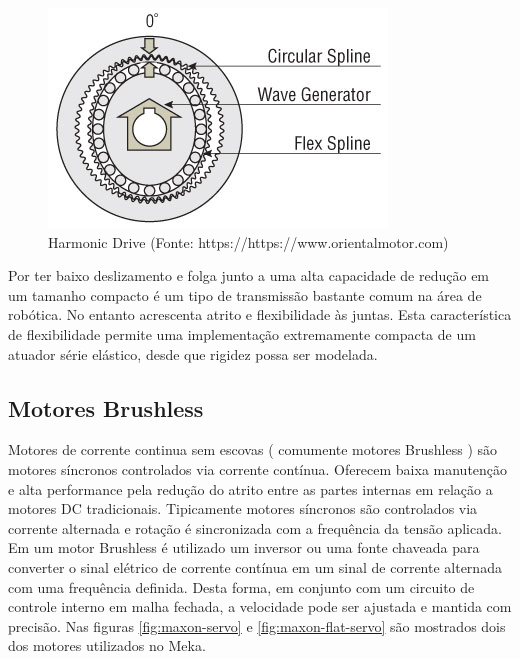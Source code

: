 \begin{figure}[H]
    \centering
    \includegraphics[width=0.6\linewidth]{tex/figs/harmonic-gear-structure.jpg}
    \caption{Harmonic Drive (Fonte: https://https://www.orientalmotor.com)}
    \label{fig:harmonic_drive}
\end{figure}

Por ter baixo deslizamento e folga junto a uma alta capacidade de redução em um tamanho compacto é um tipo de transmissão bastante comum na área de robótica. No entanto acrescenta atrito e flexibilidade às juntas. Esta característica de flexibilidade permite uma implementação extremamente compacta de um atuador série elástico, desde que rigidez possa ser modelada.





\subsection{Motores Brushless}
Motores de corrente continua sem escovas ( comumente motores Brushless ) são motores síncronos controlados via corrente contínua. Oferecem baixa manutenção e alta performance pela redução do atrito entre as partes internas em relação a motores DC tradicionais. Tipicamente motores síncronos são controlados via corrente alternada e rotação é sincronizada com a frequência da tensão aplicada. Em um motor Brushless é utilizado um inversor ou uma fonte chaveada para converter o sinal elétrico de corrente contínua em um sinal de corrente alternada com uma frequência definida. Desta forma, em conjunto com um circuito de controle interno em malha fechada, a velocidade pode ser ajustada e mantida com precisão. Nas figuras \ref{fig:maxon-servo} e \ref{fig:maxon-flat-servo} são mostrados dois dos motores utilizados no Meka.

